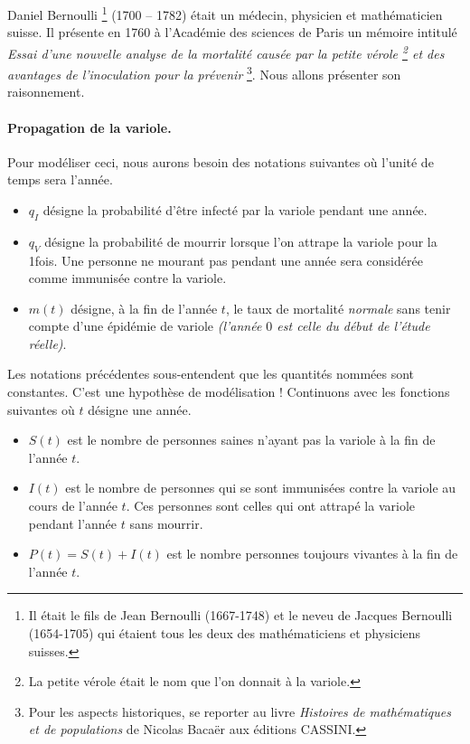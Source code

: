 Daniel Bernoulli
\footnote{
	Il était le fils de Jean Bernoulli (1667-1748) et le neveu de Jacques Bernoulli (1654-1705) qui étaient tous les deux des mathématiciens et physiciens suisses.
}
(1700 -- 1782) était un médecin, physicien et mathématicien suisse. Il présente en 1760 à l'Académie des sciences de Paris un mémoire intitulé \emph{\og Essai d'une nouvelle analyse de la mortalité causée par la petite vérole
\footnote{
	La petite vérole était le nom que l'on donnait à la variole.
}
et des avantages de l'inoculation pour la prévenir \fg}
\footnote{
	Pour les aspects historiques, se reporter au livre \emph{\og Histoires de mathématiques et de populations \fg} de Nicolas Bacaër aux éditions CASSINI.
}.
Nous allons présenter son raisonnement.




\paragraph{Propagation de la variole.} Pour modéliser ceci, nous aurons besoin des notations suivantes où l'unité de temps sera l'année.

\begin{itemize}[label=\small\textbullet]
	\item $q_I$ désigne la probabilité d'être infecté par la variole pendant une année.

	\item $q_V$ désigne la probabilité de mourrir lorsque l'on attrape la variole pour la 1\iere fois. Une personne ne mourant pas pendant une année sera considérée comme immunisée contre la variole.

	\item $m(t)$ désigne, à la fin de l'année $t$, le taux de mortalité \emph{\og normale \fg} sans tenir compte d'une épidémie de variole \emph{(l'année $0$ est celle du début de l'étude réelle)}. 
\end{itemize}

Les notations précédentes sous-entendent que les quantités nommées sont constantes. C'est une hypothèse de modélisation ! Continuons avec les fonctions suivantes où $t$ désigne une année.

\begin{itemize}[label=\small\textbullet]
	\item $S(t)$ est le nombre de personnes saines n'ayant pas la variole à la fin de l'année $t$.

	\item $I(t)$ est le nombre de personnes qui se sont immunisées contre la variole au cours de l'année $t$. Ces personnes sont celles qui ont attrapé la variole pendant l'année $t$ sans   mourrir.

	\item $P(t) = S(t) + I(t)$ est le nombre personnes toujours vivantes à la fin de l'année $t$. 
\end{itemize}



